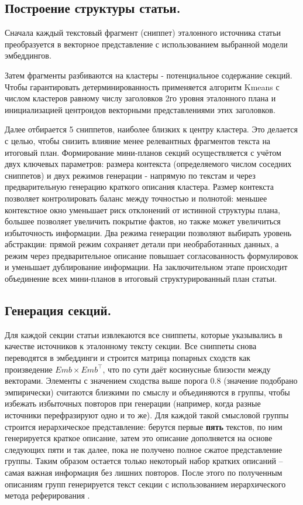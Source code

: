 \documentclass{article}
\begin{document}
\subsection*{Построение структуры статьи.}
Сначала каждый текстовый фрагмент (сниппет) эталонного источника статьи преобразуется в векторное представление с использованием выбранной модели эмбеддингов. 

Затем фрагменты разбиваются на кластеры - потенциальное содержание секций. 
Чтобы гарантировать детерминированность применяется алгоритм Kmeans с числом кластеров равному числу заголовков 2го уровня эталонного плана и инициализацией центроидов векторными представлениями этих заголовков. 

Далее отбирается 5 сниппетов, наиболее близких к центру кластера. Это делается с целью, чтобы снизить влияние менее релевантных фрагментов текста на итоговый план. 
Формирование мини-планов секций осуществляется с учётом двух ключевых параметров: 
размера контекста (определяемого числом соседних сниппетов) и двух режимов генерации - напрямую по текстам и через предварительную генерацию краткого описания кластера.
Размер контекста позволяет контролировать баланс между точностью и полнотой: 
меньшее контекстное окно уменьшает риск отклонений от истинной структуры плана, большее позволяет увеличить покрытие фактов, но также может увеличиться избыточность информации.
Два режима генерации позволяют выбирать уровень абстракции: 
прямой режим сохраняет детали при необработанных данных, а режим через предварительное описание
повышает согласованность формулировок и уменьшает дублирование информации.
На заключительном этапе происходит объединение всех мини-планов в итоговый структурированный план статьи.

\subsection*{Генерация секций.}
Для каждой секции статьи извлекаются все сниппеты, которые указывались в качестве источников к эталонному тексту секции. 
Все сниппеты снова переводятся в эмбеддинги и строится матрица попарных сходств как произведение \(Emb \times Emb^\top\), что по сути даёт косинусные близости между векторами. 
Элементы с значением сходства выше порога 0.8 (значение подобрано эмпирически) считаются близкими по смыслу и объединяются в группы, 
чтобы избежать избыточных повторов при генерации (например, когда разные источники перефразируют одно и то же). 
Для каждой такой смысловой группы строится иерархическое представление: 
берутся первые \textbf{пять} текстов, по ним генерируется краткое описание, затем это описание дополняется на основе следующих пяти и так далее, пока не получено полное сжатое представление группы.
Таким образом остается только некоторый набор кратких описаний – самая важная информация без лишних повторов.
После этого по полученным описаниям групп генерируется текст секции с использованием иерархического метода реферирования \cite{hier}.
\end{document}
